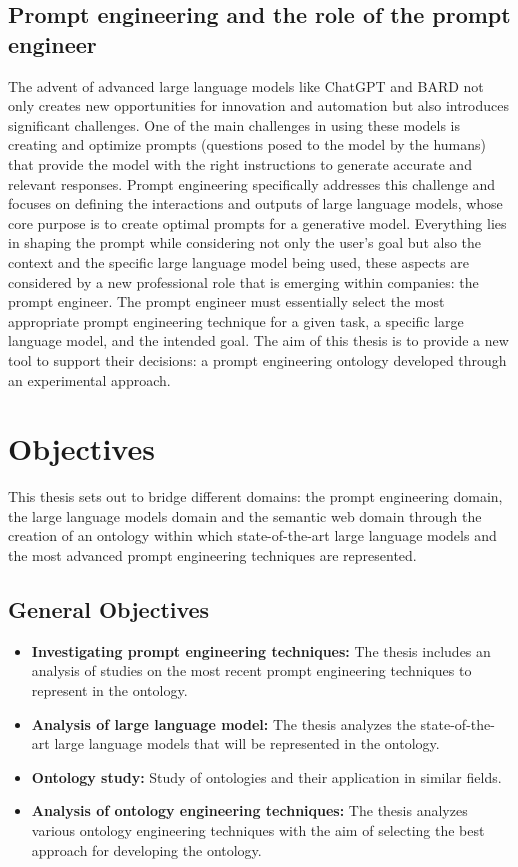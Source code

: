 \subsection{Prompt engineering and the role of the prompt engineer}
The advent of advanced large language models like ChatGPT and BARD not only creates new opportunities for innovation and automation but also introduces significant challenges. One of the main challenges in using these models is creating and optimize prompts (questions posed to the model by the humans) \cite{ref5} that provide the model with the right instructions to generate accurate and relevant responses. Prompt engineering specifically addresses this challenge and focuses on defining the interactions and outputs of large language models, whose core purpose is to create optimal prompts for a generative model.\cite{amatriain2024prompt}
Everything lies in shaping the prompt while considering not only the user’s goal but also the context and the specific large language model being used, these aspects are considered by a new professional role that is emerging within companies: the prompt engineer. The prompt engineer must essentially select the most appropriate prompt engineering technique for a given task, a specific large language model, and the intended goal. The aim of this thesis is to provide a new tool to support their decisions: a prompt engineering ontology developed through an experimental approach.

\newpage
\section{Objectives}
This thesis sets out to bridge different domains: the prompt engineering domain, the large language models domain and the semantic web domain through the creation of an ontology within which state-of-the-art large language models and the most advanced prompt engineering techniques are represented.

\subsection{General Objectives}
\begin{itemize}
    \item \textbf{Investigating prompt engineering techniques:} The thesis includes an analysis of studies on the most recent prompt engineering techniques to represent in the ontology.

    \item \textbf{Analysis of large language model:} The thesis analyzes the state-of-the-art large language models that will be represented in the ontology.

    \item \textbf{Ontology study:} Study of ontologies and their application in similar fields.

    \item \textbf{Analysis of ontology engineering techniques:} The thesis analyzes various ontology engineering techniques with the aim of selecting the best approach for developing the ontology.
    
\end{itemize}


